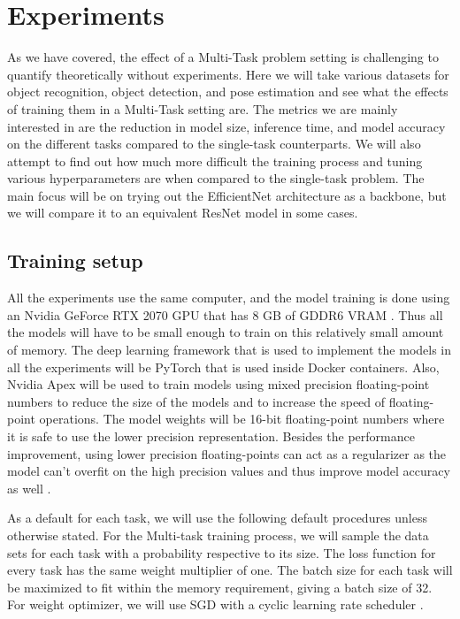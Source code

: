 \chapter{Experiments}
As we have covered, the effect of a Multi-Task problem setting is challenging to quantify theoretically without experiments.
Here we will take various datasets for object recognition, object detection, and pose estimation and see what the effects of training them in a Multi-Task setting are.
The metrics we are mainly interested in are the reduction in model size, inference time, and model accuracy on the different tasks compared to the single-task counterparts.
We will also attempt to find out how much more difficult the training process and tuning various hyperparameters are when compared to the single-task problem.
The main focus will be on trying out the EfficientNet architecture as a backbone, but we will compare it to an equivalent ResNet model in some cases.

\section{Training setup}
All the experiments use the same computer, and the model training is done using an Nvidia GeForce RTX 2070 GPU that has 8 GB of GDDR6 VRAM \citep{nvidiaRTX}.
Thus all the models will have to be small enough to train on this relatively small amount of memory.
The deep learning framework that is used to implement the models in all the experiments will be PyTorch \citep{pytorch} that is used inside Docker \citep{docker} containers.
Also, Nvidia Apex \citep{Apex} will be used to train models using mixed precision floating-point numbers to reduce the size of the models and to increase the speed of floating-point operations.
The model weights will be 16-bit floating-point numbers where it is safe to use the lower precision representation.
Besides the performance improvement, using lower precision floating-points can act as a regularizer as the model can't overfit on the high precision values and thus improve model accuracy as well \citep{mixedTraining}.

As a default for each task, we will use the following default procedures unless otherwise stated.
For the Multi-task training process, we will sample the data sets for each task with a probability respective to its size.
The loss function for every task has the same weight multiplier of one.
The batch size for each task will be maximized to fit within the memory requirement, giving a batch size of 32.
For weight optimizer, we will use SGD with a cyclic learning rate scheduler \citep{cycliclr}.


